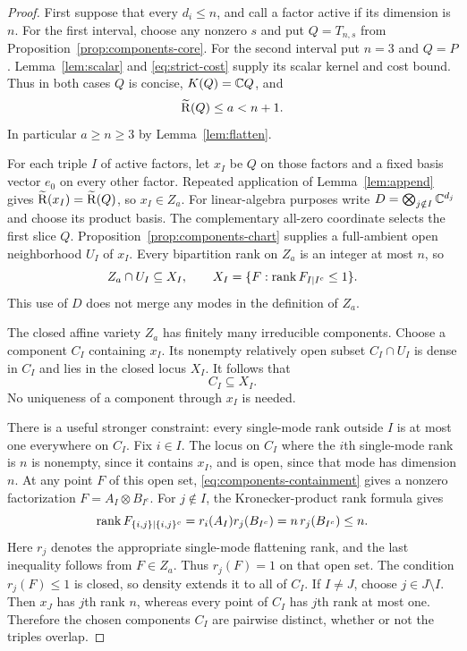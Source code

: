 \begin{proof}
First suppose that every $d_i\leq n$, and call a factor active if its
dimension is $n$. For the first interval, choose any nonzero $s$ and
put $Q=T_{n,s}$ from Proposition~\ref{prop:components-core}. For the
second interval put $n=3$ and $Q=P$. Lemma~\ref{lem:scalar} and
\eqref{eq:strict-cost} supply its scalar kernel and cost bound. Thus
in both cases $Q$ is concise, $K(Q)=\mathbb C Q$, and
\[
                         \widetilde{\mathrm R}(Q)\leq a<n+1.
\]
In particular $a\geq n\geq3$ by Lemma~\ref{lem:flatten}.

For each triple $I$ of active factors, let $x_I$ be $Q$ on those
factors and a fixed basis vector $e_0$ on every other factor.
Repeated application of Lemma~\ref{lem:append} gives
$\widetilde{\mathrm R}(x_I)=\widetilde{\mathrm R}(Q)$, so $x_I\in Z_a$.
For linear-algebra purposes write
$D=\bigotimes_{j\notin I}\mathbb C^{d_j}$ and choose its product basis.
The complementary all-zero coordinate selects the first slice $Q$.
Proposition~\ref{prop:components-chart} supplies a full-ambient open
neighborhood $U_I$ of $x_I$. Every bipartition rank on $Z_a$ is an
integer at most $n$, so
\begin{equation}\label{eq:components-local}
 Z_a\cap U_I\subseteq X_I,
 \qquad X_I=\{F:\operatorname{rank} F_{I\mid I^c}\leq1\}.
\end{equation}
This use of $D$ does not merge any modes in the definition of $Z_a$.

The closed affine variety $Z_a$ has finitely many irreducible components.
Choose a component $C_I$ containing $x_I$. Its nonempty relatively
open subset $C_I\cap U_I$ is dense in $C_I$ and lies in the closed
locus $X_I$. It follows that
\begin{equation}\label{eq:components-containment}
                              C_I\subseteq X_I.
\end{equation}
No uniqueness of a component through $x_I$ is needed.

There is a useful stronger constraint: every single-mode rank outside
$I$ is at most one everywhere on $C_I$. Fix $i\in I$. The locus on
$C_I$ where the $i$th single-mode rank is $n$ is nonempty, since it
contains $x_I$, and is open, since that mode has dimension $n$.
At any point $F$ of this open set, \eqref{eq:components-containment}
gives a nonzero factorization $F=A_I\otimes B_{I^c}$. For $j\notin I$,
the Kronecker-product rank formula gives
\[
 \operatorname{rank} F_{\{i,j\}\mid\{i,j\}^c}
      =r_i(A_I)r_j(B_{I^c})=n\,r_j(B_{I^c})\leq n.
\]
Here $r_j$ denotes the appropriate single-mode flattening rank, and
the last inequality follows from $F\in Z_a$. Thus $r_j(F)=1$ on
that open set. The condition $r_j(F)\leq1$ is closed, so density
extends it to all of $C_I$. If $I\ne J$, choose $j\in J\setminus I$.
Then $x_J$ has $j$th rank $n$, whereas every point of $C_I$ has
$j$th rank at most one. Therefore the chosen components $C_I$ are
pairwise distinct, whether or not the triples overlap.


\end{proof}
